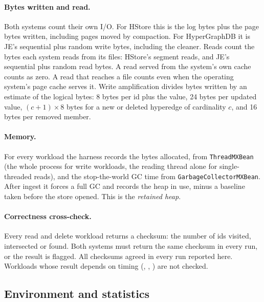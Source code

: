 \paragraph{Bytes written and read.} Both systems count their own I/O. For HStore this is the log bytes plus the page bytes written, including pages moved by compaction. For HyperGraphDB it is JE's sequential plus random write bytes, including the cleaner. Reads count the bytes each system reads from its files: HStore's segment reads, and JE's sequential plus random read bytes. A read served from the system's own cache counts as zero. A read that reaches a file counts even when the operating system's page cache serves it. Write amplification divides bytes written by an estimate of the logical bytes: 8 bytes per id plus the value, 24 bytes per updated value, $(c+1)\times 8$ bytes for a new or deleted hyperedge of cardinality $c$, and 16 bytes per removed member.

\paragraph{Memory.} For every workload the harness records the bytes allocated, from \texttt{ThreadMXBean} (the whole process for write workloads, the reading thread alone for single-threaded reads), and the stop-the-world GC time from \texttt{GarbageCollectorMXBean}. After ingest it forces a full GC and records the heap in use, minus a baseline taken before the store opened. This is the \emph{retained heap}.

\paragraph{Correctness cross-check.} Every read and delete workload returns a checksum: the number of ids visited, intersected or found. Both systems must return the same checksum in every run, or the result is flagged. All checksums agreed in every run reported here. Workloads whose result depends on timing (, , ) are not checked.

\subsection{Environment and statistics}
\label{sec:environment}

